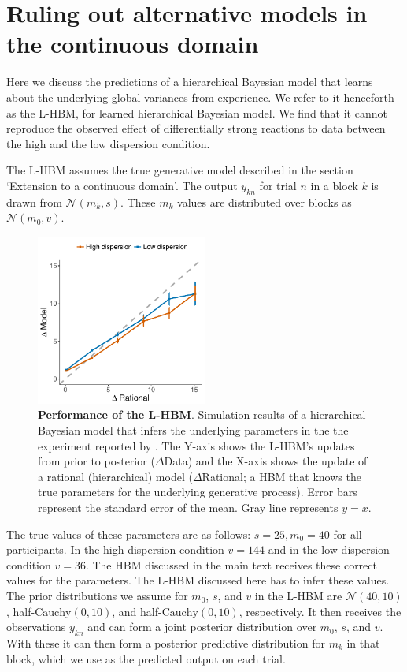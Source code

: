 \newpage 

\section{Ruling out alternative models in the continuous domain}
Here we discuss the predictions of a hierarchical Bayesian model that learns about the underlying global variances from experience. We refer to it henceforth as the L-HBM, for learned hierarchical Bayesian model. We find that it cannot reproduce the observed effect of differentially strong reactions to data between the high and the low dispersion condition. 

The L-HBM assumes the true generative model described in the section `Extension to a continuous domain'. The output $y_{kn}$ for trial $n$ in a block $k$ is drawn from $\mathcal{N}(m_k,s)$. These $m_k$ values are distributed over blocks as $\mathcal{N}(m_0,v)$.


\begin{figure}[hb!]
\centering
    \includegraphics[width=0.5\textwidth]{figures/samstan.pdf}
  \caption{\textbf{Performance of the L-HBM}. Simulation results of a hierarchical Bayesian model that infers the underlying parameters in the the experiment reported by \cite{gershman2017blessing}. The Y-axis shows the L-HBM's updates from prior to posterior ($\Delta$Data) and the X-axis shows the update of a rational (hierarchical) model ($\Delta$Rational; a HBM that knows the true parameters for the underlying generative process). Error bars represent the standard error of the mean. Gray line represents $y=x$.} 
  \label{fig:App:hierBayes}
\end{figure}

The true values of these parameters are as follows: $s = 25, m_0 = 40$ for all participants. In the high dispersion condition $v = 144$ and in the low dispersion condition $v = 36$.  The HBM discussed in the main text receives these correct values for the parameters. The L-HBM discussed here has to infer these values. The prior distributions we assume for $m_0$, $s$, and $v$ in the L-HBM are $\mathcal{N}(40,10)$, half-$\mathrm{Cauchy}(0,10)$, and half-$\mathrm{Cauchy}(0,10)$, respectively. It then receives the observations $y_{kn}$ and can form a joint posterior distribution over $m_0$, $s$, and $v$. With these it can then form a posterior predictive distribution for $m_k$ in that block, which we use as the predicted output on each trial.

